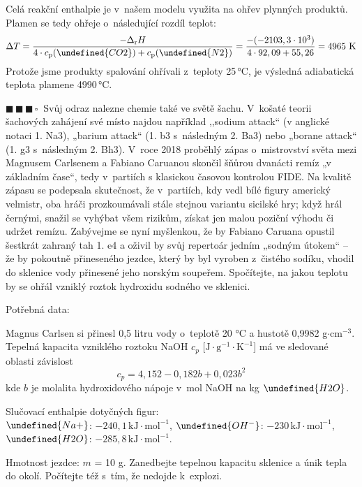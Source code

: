 \documentclass{book}
\let\ch\undefined
\newcommand{\tri}{$\blacksquare \, \blacksquare \, \blacksquare \, \square \; \; $}
\renewenvironment{quotation}{\par}{\par} %
\begin{document}
Celá reakční enthalpie je v~našem modelu využita na ohřev plynných
produktů. Plamen se tedy ohřeje o~následující rozdíl teplot: 
\[
\Delta T=\frac{-\Delta_{\mathrm{r}}H}{4\cdot\-c_{\mathrm{p}}(\ch{CO2})+c_{\mathrm{p}}(\ch{N2})}=\frac{-(-2103,3 \cdot 10^3 )}{4\cdot 92,09 + 55,26} =4965\mathrm{~K}
\]
Protože jsme produkty spalování ohřívali z~teploty 25\,°C, je výsledná
adiabatická teplota plamene 4990\,°C.

\hrulefill %
\begin{quotation}
\tri Svůj odraz nalezne chemie také ve světě šachu. V~košaté teorii šachových
zahájení své místo najdou například ,,sodium attack`` (v anglické
notaci 1. Na3), „barium attack“ (1. b3 s~následným 2. Ba3) nebo „borane
attack“ (1. g3 s~následným 2. Bh3). V~roce 2018 
proběhlý zápas o~mistrovství světa mezi Magnusem Carlsenem a Fabiano
Caruanou skončil šňůrou dvanácti remíz „v základním čase“, tedy v~partiích
s klasickou časovou kontrolou FIDE. Na kvalitě zápasu se podepsala
skutečnost, že v~partiích, kdy vedl bílé figury americký velmistr,
oba hráči prozkoumávali stále stejnou variantu sicilské hry; když
hrál černými, snažil se vyhýbat všem rizikům, získat jen malou poziční
výhodu či udržet remízu. Zabývejme se nyní myšlenkou, že by Fabiano
Caruana opustil šestkrát zahraný tah 1. e4 a oživil by svůj repertoár
jedním „sodným útokem“ -- že by pokoutně přineseného jezdce, který
by byl vyroben z~čistého sodíku, vhodil do sklenice vody přinesené
jeho norským soupeřem. Spočítejte, na jakou teplotu by se ohřál vzniklý
roztok hydroxidu sodného ve sklenici.

Potřebná data:

Magnus Carlsen si přinesl 0,5 litru vody o~teplotě 20 °C a hustotě
0,9982 g$\cdot$cm$^{-3}$. Tepelná kapacita vzniklého roztoku NaOH
$c_{p}$ {[}$\mathrm{J\cdot g^{-1}\cdot K^{-1}}${]} má ve sledované
oblasti závislost 
\[
c_{p}=4,152-0,182b+0,023b^{2}
\]
kde $b$ je molalita hydroxidového nápoje v~mol NaOH na kg $\ch{H2O}$.

Slučovací enthalpie dotyčných figur: \\
 $\ch{Na+}$: $-240,1\,\mathrm{kJ\cdot mol^{-1}}$, $\ch{OH^{-}}$:
$-230\,\mathrm{kJ\cdot mol^{-1}}$, $\ch{H2O}$: $-285,8\,\mathrm{kJ\cdot mol^{-1}}$.

Hmotnost jezdce: $m$ = 10 g. Zanedbejte tepelnou kapacitu sklenice a
únik tepla do okolí. Počítejte též s~tím, že nedojde k~explozi.
\end{quotation} \dotfill \par 
\end{document}
